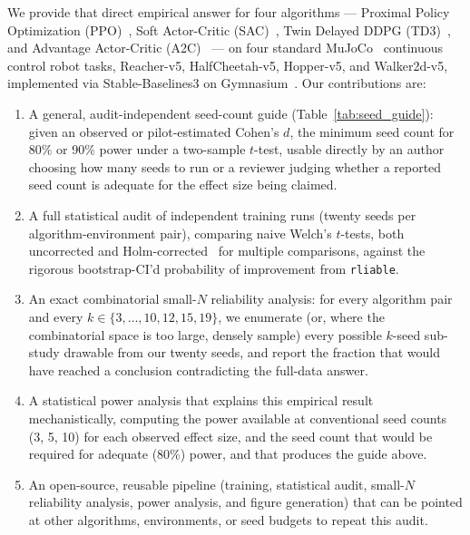 \documentclass[journal]{IEEEtran}
\begin{document}
We provide that direct empirical answer for four algorithms — Proximal Policy Optimization
(PPO)~\cite{schulman2017proximal}, Soft Actor-Critic (SAC)~\cite{haarnoja2018soft}, Twin Delayed
DDPG (TD3)~\cite{fujimoto2018addressing}, and Advantage Actor-Critic
(A2C)~\cite{mnih2016asynchronous} — on four standard MuJoCo~\cite{todorov2012mujoco} continuous
control robot tasks, Reacher-v5, HalfCheetah-v5, Hopper-v5, and Walker2d-v5, implemented via
Stable-Baselines3 \cite{raffin2021stable} on Gymnasium~\cite{towers2024gymnasium}. Our contributions
are:

\begin{enumerate}
  \item A general, audit-independent seed-count guide (Table~\ref{tab:seed_guide}): given an
    observed or pilot-estimated Cohen's $d$, the minimum seed count for 80\% or 90\% power under a
    two-sample $t$-test, usable directly by an author choosing how many seeds to run or a reviewer
    judging whether a reported seed count is adequate for the effect size being claimed.
  \item A full statistical audit of  independent training runs
    (twenty seeds per algorithm-environment pair), comparing naive Welch's $t$-tests, both
    uncorrected and Holm-corrected~\cite{holm1979sequentially} for multiple comparisons, against
    the rigorous bootstrap-CI'd probability of improvement from \texttt{rliable}.
  \item An exact combinatorial small-$N$ reliability analysis: for every algorithm pair and every
    $k \in \{3,\ldots,10,12,15,19\}$, we enumerate (or, where the combinatorial space is too large,
    densely sample) every possible $k$-seed sub-study drawable from our twenty seeds, and report the
    fraction that would have reached a conclusion contradicting the full-data answer.
  \item A statistical power analysis that explains this empirical result mechanistically, computing
    the power available at conventional seed counts (3, 5, 10) for each observed effect size, and
    the seed count that would be required for adequate (80\%) power, and that produces the guide
    above.
  \item An open-source, reusable pipeline (training, statistical audit, small-$N$ reliability
    analysis, power analysis, and figure generation) that can be pointed at other algorithms,
    environments, or seed budgets to repeat this audit.
\end{enumerate}
\end{document}
